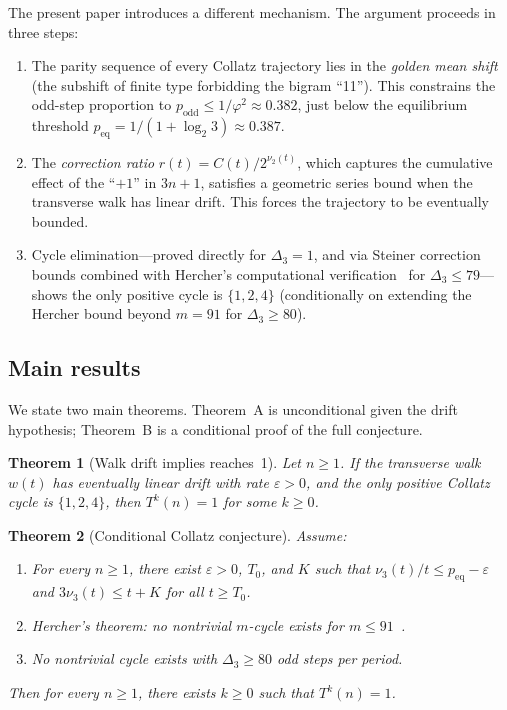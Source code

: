\documentclass[manuscript]{aomart}
\theoremstyle{plain}
\newtheorem{theoremA}{Theorem}
\theoremstyle{definition}
\theoremstyle{remark}
\numberwithin{equation}{section}
\begin{document}
The present paper introduces a different mechanism.  The argument
proceeds in three steps:
\begin{enumerate}
  \item The parity sequence of every Collatz trajectory lies in the
    \emph{golden mean shift} (the subshift of finite type forbidding
    the bigram ``11'').  This constrains the odd-step proportion to
    $p_{\mathrm{odd}} \le 1/\varphi^2 \approx 0.382$, just below the
    equilibrium threshold $p_{\mathrm{eq}} = 1/(1 + \log_2 3)
    \approx 0.387$.
  \item The \emph{correction ratio} $r(t) = C(t)/2^{\nu_2(t)}$,
    which captures the cumulative effect of the ``$+1$'' in $3n+1$,
    satisfies a geometric series bound when the transverse walk has
    linear drift.  This forces the trajectory to be eventually
    bounded.
  \item Cycle elimination---proved directly for $\Delta_3 = 1$,
    and via Steiner correction bounds combined with Hercher's
    computational verification~\cite{Hercher2024} for
    $\Delta_3 \le 79$---shows the only positive cycle is
    $\{1, 2, 4\}$ (conditionally on extending the Hercher bound
    beyond $m = 91$ for $\Delta_3 \ge 80$).
\end{enumerate}

\subsection{Main results}

We state two main theorems.  Theorem~A is unconditional given the
drift hypothesis; Theorem~B is a conditional proof of the full
conjecture.

\begin{theoremA}[Walk drift implies reaches~1]\label{thm:A}
Let $n \ge 1$.  If the transverse walk $w(t)$ has eventually linear
drift with rate $\varepsilon > 0$, and the only positive Collatz
cycle is $\{1, 2, 4\}$, then $T^k(n) = 1$ for some $k \ge 0$.
\end{theoremA}

\begin{theoremA}[Conditional Collatz conjecture]\label{thm:B}
Assume:
\begin{enumerate}
  \item[\textup{(H1)}] For every $n \ge 1$, there exist
    $\varepsilon > 0$, $T_0$, and $K$ such that
    $\nu_3(t)/t \le p_{\mathrm{eq}} - \varepsilon$ and
    $3\nu_3(t) \le t + K$ for all $t \ge T_0$.
  \item[\textup{(H2)}] Hercher's theorem: no nontrivial $m$-cycle
    exists for $m \le 91$~\cite{Hercher2024}.
  \item[\textup{(H3)}] No nontrivial cycle exists with
    $\Delta_3 \ge 80$ odd steps per period.
\end{enumerate}
Then for every $n \ge 1$, there exists $k \ge 0$ such that
$T^k(n) = 1$.
\end{theoremA}
\end{document}
